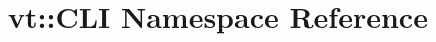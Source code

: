 \hypertarget{namespacevt_1_1_c_l_i}{}\section{vt\+:\+:C\+LI Namespace Reference}
\label{namespacevt_1_1_c_l_i}
